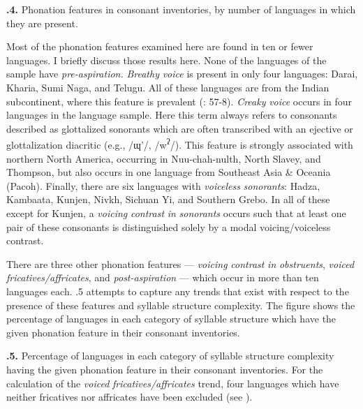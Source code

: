 \textbf{.4.} Phonation features in consonant inventories, by number of languages in which they are present.



  Most of the phonation features examined here are found in ten or fewer languages. I briefly discuss those results here. None of the languages of the sample have \textit{pre-aspiration.} \textit{Breathy} \textit{voice} is present in only four languages: Darai, Kharia, Sumi Naga, and Telugu. All of these languages are from the Indian subcontinent, where this feature is prevalent (\citealt{LadefogedMaddieson1996}: 57-8). \textit{Creaky} \textit{voice} occurs in four languages in the language sample. Here this term always refers to consonants described as glottalized sonorants which are often transcribed with an ejective or glottalization diacritic (e.g., /ɰ’/, /w\textsuperscript{ʔ}/). This feature is strongly associated with northern North America, occurring in Nuu-chah-nulth, North Slavey, and Thompson, but also occurs in one language from Southeast Asia \& Oceania (Pacoh). Finally, there are six languages with \textit{voiceless} \textit{sonorants}: Hadza, Kambaata, Kunjen, Nivkh, Sichuan Yi, and Southern Grebo. In all of these except for Kunjen, a \textit{voicing} \textit{contrast} \textit{in} \textit{sonorants} occurs such that at least one pair of these consonants is distinguished solely by a modal voicing/voiceless contrast.



  There are three other phonation features — \textit{voicing} \textit{contrast} \textit{in} \textit{obstruents}, \textit{voiced} \textit{fricatives/affricates}, and \textit{post-aspiration} — which occur in more than ten languages each. .5 attempts to capture any trends that exist with respect to the presence of these features and syllable structure complexity. The figure shows the percentage of languages in each category of syllable structure which have the given phonation feature in their consonant inventories.





\textbf{.5.} Percentage of languages in each category of syllable structure complexity having the given phonation feature in their consonant inventories. For the calculation of the \textit{voiced} \textit{fricatives/affricates} trend, four languages which have neither fricatives nor affricates have been excluded (see ).



